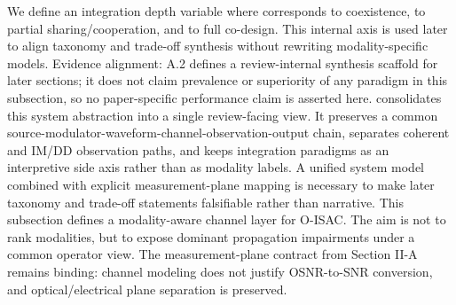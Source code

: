 \markdownRendererUlEndTight \markdownRendererInterblockSeparator
{}We define an integration depth variable\markdownRendererSoftLineBreak
{}\markdownRendererSoftLineBreak
{}where  corresponds to coexistence,  to partial sharing/cooperation, and  to full co-design. This internal axis is used later to align taxonomy and trade-off synthesis without rewriting modality-specific models.\markdownRendererParagraphSeparator
{}Evidence alignment: A.2 defines a review-internal synthesis scaffold for later sections; it does not claim prevalence or superiority of any paradigm in this subsection, so no paper-specific performance claim is asserted here.\markdownRendererParagraphSeparator
{} consolidates this system abstraction into a single review-facing view. It preserves a common source-modulator-waveform-channel-observation-output chain, separates coherent and IM/DD observation paths, and keeps integration paradigms as an interpretive side axis rather than as modality labels.\markdownRendererParagraphSeparator
{}\markdownRendererParagraphSeparator
{} A unified system model combined with explicit measurement-plane mapping is necessary to make later taxonomy and trade-off statements falsifiable rather than narrative.\markdownRendererInterblockSeparator
{}\markdownRendererThematicBreak{}\markdownRendererInterblockSeparator
{}
\markdownRendererSectionEnd 
\markdownRendererSectionEnd \markdownRendererSectionBegin
{}\markdownRendererInterblockSeparator
{}This subsection defines a modality-aware channel layer for O-ISAC. The aim is not to rank modalities, but to expose dominant propagation impairments under a common operator view. The measurement-plane contract from Section II-A remains binding: channel modeling does not justify OSNR-to-SNR conversion, and optical/electrical plane separation is preserved.\markdownRendererInterblockSeparator
